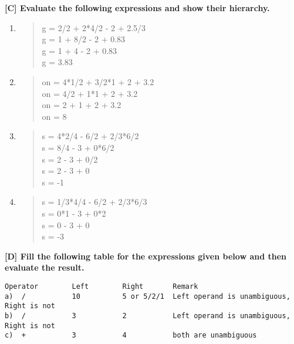\documentclass{report}
\begin{document}
\textbf{[C] Evaluate the following expressions and show their hierarchy.}
\begin{enumerate}
    \renewcommand{\labelenumi}{\alph{enumi}}
  \item \begin{quote}
    g = 2/2 + 2*4/2 - 2 + 2.5/3\\
    g = 1 + 8/2 - 2 + 0.83\\
    g = 1 + 4 - 2 + 0.83\\
    g = 3.83\\
  \end{quote}
  \item \begin{quote}
      on = 4*1/2 + 3/2*1 + 2 + 3.2\\
      on = 4/2 + 1*1 + 2 + 3.2\\
      on = 2 + 1 + 2 + 3.2\\
      on = 8\\
  \end{quote}
  \item \begin{quote}
      s = 4*2/4 - 6/2 + 2/3*6/2\\
      s = 8/4 - 3 + 0*6/2\\
      s = 2 - 3 + 0/2\\
      s = 2 - 3 + 0\\
      s = -1\\
  \end{quote}
  \item \begin{quote}
      s = 1/3*4/4 - 6/2 + 2/3*6/3\\
      s = 0*1 - 3 + 0*2\\
      s = 0 - 3 + 0\\
      s = -3\\
  \end{quote}
\end{enumerate}

\textbf{[D] Fill the following table for the expressions given below and then evaluate the result.}
\begin{verbatim}
Operator        Left        Right       Remark
a)  /           10          5 or 5/2/1  Left operand is unambiguous, Right is not
b)  /           3           2           Left operand is unambiguous, Right is not 
c)  +           3           4           both are unambiguous
\end{verbatim}
\end{document}
